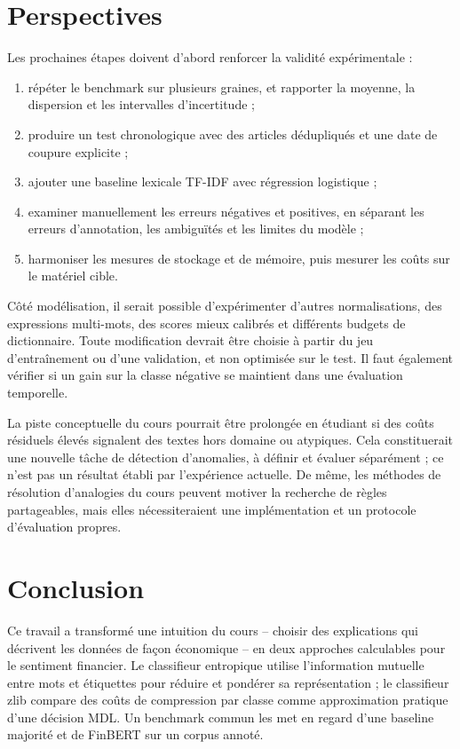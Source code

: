 \documentclass[11pt,a4paper]{article}
\begin{document}
\section{Perspectives}

Les prochaines étapes doivent d'abord renforcer la validité expérimentale :
\begin{enumerate}
  \item répéter le benchmark sur plusieurs graines, et rapporter la moyenne,
  la dispersion et les intervalles d'incertitude ;
  \item produire un test chronologique avec des articles dédupliqués et une
  date de coupure explicite ;
  \item ajouter une baseline lexicale TF-IDF avec régression logistique ;
  \item examiner manuellement les erreurs négatives et positives, en séparant
  les erreurs d'annotation, les ambiguïtés et les limites du modèle ;
  \item harmoniser les mesures de stockage et de mémoire, puis mesurer les
  coûts sur le matériel cible.
\end{enumerate}

Côté modélisation, il serait possible d'expérimenter d'autres normalisations,
des expressions multi-mots, des scores mieux calibrés et différents budgets
de dictionnaire. Toute modification devrait être choisie à partir du jeu
d'entraînement ou d'une validation, et non optimisée sur le test. Il faut
également vérifier si un gain sur la classe négative se maintient dans une
évaluation temporelle.

La piste conceptuelle du cours pourrait être prolongée en étudiant si des
coûts résiduels élevés signalent des textes hors domaine ou atypiques. Cela
constituerait une nouvelle tâche de détection d'anomalies, à définir et
évaluer séparément ; ce n'est pas un résultat établi par l'expérience
actuelle. De même, les méthodes de résolution d'analogies du cours peuvent
motiver la recherche de règles partageables, mais elles nécessiteraient une
implémentation et un protocole d'évaluation propres.

\section{Conclusion}

Ce travail a transformé une intuition du cours -- choisir des explications
qui décrivent les données de façon économique -- en deux approches
calculables pour le sentiment financier. Le classifieur entropique utilise
l'information mutuelle entre mots et étiquettes pour réduire et pondérer sa
représentation ; le classifieur zlib compare des coûts de compression par
classe comme approximation pratique d'une décision MDL. Un benchmark commun
les met en regard d'une baseline majorité et de FinBERT sur un corpus annoté.
\end{document}
